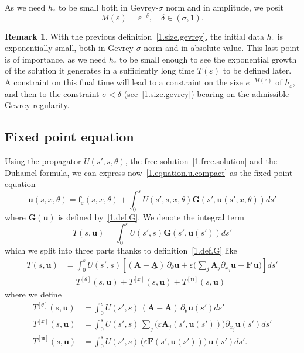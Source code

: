 \documentclass[10pt]{amsart}
\theoremstyle{definition}
\newtheorem{rema}[cdrthm]{Remark}
\theoremstyle{plain}
\newcommand*\e{\varepsilon}
\newcommand{\dptl}{\partial}%
\newcommand{\ubf}{{\mathbf u}}
\newcommand*\f{{\mathbf f}}
\newcommand*\A{{\mathbf A}}
\newcommand*\F{{\mathbf F}}
\newcommand*\und{\underline}
\begin{document}
As we need $h_{\e}$ to be small both in Gevrey-$\sigma$ norm and in amplitude, we posit
\begin{equation}\label{1.size.gevrey}
M(\e) = \e^{-\delta}, \quad \delta \in(\sigma,1).
\end{equation}

\begin{rema}\label{1.remark.size.gevrey}
With the previous definition~\eqref{1.size.gevrey}, the initial data $h_{\e}$ is exponentially small, both in Gevrey-$\sigma$ norm and in absolute value. This last point is of importance, as we need $h_{\e}$ to be small enough to see the exponential growth of the solution it generates in a sufficiently long time $T(\e)$ to be defined later. A constraint on this final time will lead to a constraint on the size $e^{-M(\e)}$ of $h_{\e}$, and then to the constraint $\sigma < \delta$ (see~\eqref{1.size.gevrey}) bearing on the admissible Gevrey regularity.
\end{rema}



\subsection{Fixed point equation}

Using the propagator $U(s',s,\theta)$, the free solution~\eqref{1.free.solution} and the Duhamel formula, we can express now~\eqref{1.equation.u.compact} as the fixed point equation
\begin{equation}\label{1.fixed.point.equation}
\ubf(s,x,\theta) = \f_{\e}(s,x,\theta) + \int_{0}^{s} U(s',s,x,\theta) {\mathbf G}(s',\ubf(s',x,\theta)) ds'
\end{equation}
where ${\mathbf G}(\ubf)$ is defined by~\eqref{1.def.G}. We denote the integral term
\begin{equation}\label{1.defi.T}
T(s,\ubf) = \int_{0}^{s} U(s',s) {\mathbf G}(s',\ubf(s')) ds'
\end{equation}
which we split into three parts thanks to definition~\eqref{1.def.G} like
\begin{equation}\label{1.defi.T.decoupage}
\begin{aligned}
T(s,\ubf) & = \int_{0}^{s} U(s',s) \left[\left({\mathbf A} - \und{{\mathbf A}} \right)\,\dptl_{\theta} \ubf + \e\bigg(\sum_j {\mathbf A}_j \dptl_{x_j} \ubf + {\mathbf F} \, \ubf\bigg) \right] ds' \\
& = T^{[\theta]}(s,\ubf) + T^{[x]}(s,\ubf) + T^{[\ubf]}(s,\ubf)
\end{aligned}
\end{equation}
where we define
\begin{align}
T^{[\theta]}(s,\ubf) & = \int_{0}^{s} U(s',s) \,\left({\mathbf A} - \und{{\mathbf A}} \right) \,\dptl_{\theta} \ubf(s') ds' \label{1.def.T_theta}
\\
T^{[x]}(s,\ubf) & = \int_{0}^{s} U(s',s)\, \sum_j\big(\e\A_j(s',\ubf(s'))\big) \dptl_{x_j} \ubf(s') ds' \label{1.def.T_x}
\\
T^{[\ubf]}(s,\ubf) & = \int_{0}^{s} U(s',s) \, \big(\e \F(s',\ubf(s'))\big) \, \ubf(s') ds' \label{1.def.T_u}
.
\end{align}
\end{document}
